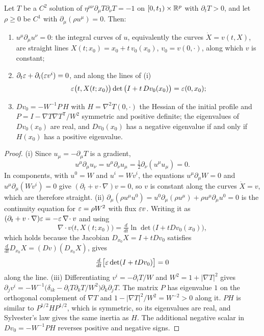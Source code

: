 \begin{lemma}\label{lem:dustflow}
Let $T$ be a $C^2$ solution of $\eta^{\mu\nu}\partial_\mu T\partial_\nu T = -1$ on $[0,t_1)\times\mathbb{R}^p$ with $\partial_t T>0$, and let $\rho\ge0$ be $C^1$ with $\partial_\mu(\rho u^\mu) = 0$. Then:
\begin{enumerate}[label=(\roman*),leftmargin=2em]
\item $u^\mu\partial_\mu u^\nu = 0$: the integral curves of $u$, equivalently the curves $\dot X = v(t,X)$, are straight lines $X(t;x_0) = x_0 + t\,v_0(x_0)$, $v_0 = v(0,\cdot)$, along which $v$ is constant;
\item $\partial_t\varepsilon + \partial_i(\varepsilon v^i) = 0$, and along the lines of (i)
\[
\varepsilon\big(t,X(t;x_0)\big)\det\big(I + t\,Dv_0(x_0)\big) = \varepsilon(0,x_0);
\]
\item $Dv_0 = -W^{-1}P\,H$ with $H = \nabla^2 T(0,\cdot)$ the Hessian of the initial profile and $P = I - \nabla T\nabla T^{\mathsf T}/W^2$ symmetric and positive definite; the eigenvalues of $Dv_0(x_0)$ are real, and $Dv_0(x_0)$ has a negative eigenvalue if and only if $H(x_0)$ has a positive eigenvalue.
\end{enumerate}
\end{lemma}

\begin{proof}
(i) Since $u_\mu = -\partial_\mu T$ is a gradient,
\[
u^\mu\partial_\mu u_\nu = u^\mu\partial_\nu u_\mu = \tfrac12\partial_\nu(u^\mu u_\mu) = 0 .
\]
In components, with $u^0=W$ and $u^i = Wv^i$, the equations $u^\mu\partial_\mu W = 0$ and $u^\mu\partial_\mu(Wv^i)=0$ give $(\partial_t + v\cdot\nabla)v = 0$, so $v$ is constant along the curves $\dot X = v$, which are therefore straight. (ii) $\partial_\mu(\rho u^\mu u^0) = u^0\partial_\mu(\rho u^\mu) + \rho u^\mu\partial_\mu u^0 = 0$ is the continuity equation for $\varepsilon = \rho W^2$ with flux $\varepsilon v$. Writing it as $(\partial_t + v\cdot\nabla)\varepsilon = -\varepsilon\,\nabla\!\cdot v$ and using
\[
\nabla\!\cdot v\big(t,X(t;x_0)\big) = \tfrac{d}{dt}\ln\det\big(I+tDv_0(x_0)\big),
\]
which holds because the Jacobian $D_{x_0}X = I + tDv_0$ satisfies $\tfrac{d}{dt}D_{x_0}X = (Dv)(D_{x_0}X)$, gives
\[
\tfrac{d}{dt}\big[\varepsilon\det(I+tDv_0)\big] = 0
\]
along the line. (iii) Differentiating $v^i = -\partial_iT/W$ and $W^2 = 1+|\nabla T|^2$ gives $\partial_j v^i = -W^{-1}\big(\delta_{ik} - \partial_iT\partial_kT/W^2\big)\partial_k\partial_jT$. The matrix $P$ has eigenvalue $1$ on the orthogonal complement of $\nabla T$ and $1-|\nabla T|^2/W^2 = W^{-2}>0$ along it. $PH$ is similar to $P^{1/2}HP^{1/2}$, which is symmetric, so its eigenvalues are real, and Sylvester's law gives the same inertia as $H$. The additional negative scalar in $Dv_0=-W^{-1}PH$ reverses positive and negative signs.
\end{proof}

